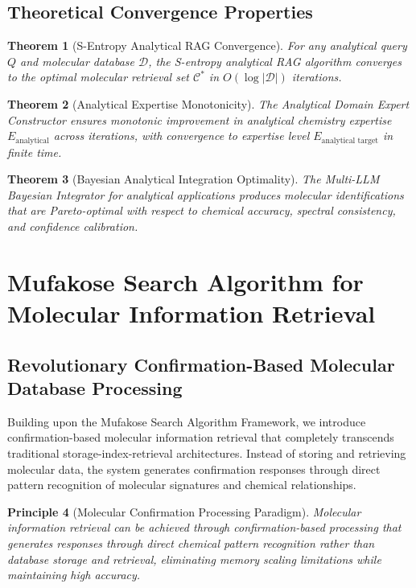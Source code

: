 \documentclass[11pt,a4paper]{article}
\newtheorem{theorem}{Theorem}[section]
\newtheorem{principle}[theorem]{Principle}
\theoremstyle{remark}
\begin{document}
{{{{{{{{{{\subsection{Theoretical Convergence Properties}

\begin{theorem}[S-Entropy Analytical RAG Convergence]
For any analytical query $Q$ and molecular database $\mathcal{D}$, the S-entropy analytical RAG algorithm converges to the optimal molecular retrieval set $\mathcal{C}^*$ in $O(\log |\mathcal{D}|)$ iterations.
\end{theorem}

\begin{theorem}[Analytical Expertise Monotonicity]
The Analytical Domain Expert Constructor ensures monotonic improvement in analytical chemistry expertise $E_{\text{analytical}}$ across iterations, with convergence to expertise level $E_{\text{analytical target}}$ in finite time.
\end{theorem}

\begin{theorem}[Bayesian Analytical Integration Optimality]
The Multi-LLM Bayesian Integrator for analytical applications produces molecular identifications that are Pareto-optimal with respect to chemical accuracy, spectral consistency, and confidence calibration.
\end{theorem}

\section{Mufakose Search Algorithm for Molecular Information Retrieval}

\subsection{Revolutionary Confirmation-Based Molecular Database Processing}

Building upon the Mufakose Search Algorithm Framework, we introduce confirmation-based molecular information retrieval that completely transcends traditional storage-index-retrieval architectures. Instead of storing and retrieving molecular data, the system generates confirmation responses through direct pattern recognition of molecular signatures and chemical relationships.

\begin{principle}[Molecular Confirmation Processing Paradigm]
Molecular information retrieval can be achieved through confirmation-based processing that generates responses through direct chemical pattern recognition rather than database storage and retrieval, eliminating memory scaling limitations while maintaining high accuracy.
\end{principle}

}}}}}}}}}}
\end{document}
